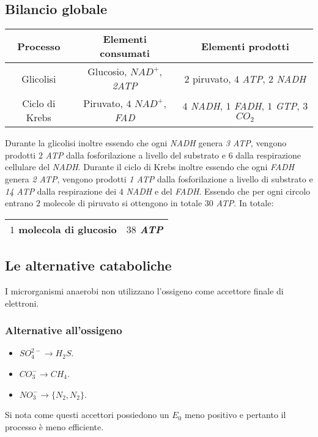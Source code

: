 	\subsection{Bilancio globale}
	\begin{center}
		\begin{tabular}{|c|c|c|}
			\hline
			Processo & Elementi consumati & Elementi prodotti \\
			\hline
			Glicolisi & Glucosio, \emph{$NAD^+$}, \emph{2ATP} & $2$ piruvato, $4$ \emph{ATP}, $2$ \emph{NADH} \\
			\hline
			Ciclo di Krebs & Piruvato, $4$ \emph{$NAD^+$}, \emph{FAD} & $4$ \emph{NADH}, $1$ \emph{FADH}, $1$ \emph{GTP}, $3$ \emph{$CO_2$} \\
			\hline
		\end{tabular}
	\end{center}
	Durante la glicolisi inoltre essendo che ogni \emph{NADH} genera \emph{3 ATP}, vengono prodotti $2$ \emph{ATP} dalla fosforilazione a livello del substrato e $6$ dalla respirazione cellulare del \emph{NADH}.
	Durante il ciclo di Krebs inoltre essendo che ogni \emph{FADH} genera \emph{2 ATP}, vengono prodotti \emph{1 ATP} dalla fosforilazione a livello di substrato e \emph{14 ATP} dalla respirazione
	dei $4$ \emph{NADH} e del \emph{FADH}.
	Essendo che per ogni circolo entrano $2$ molecole di piruvato si ottengono in totale $30$ \emph{ATP}.
	In totale:
	\begin{center}
		\begin{tabular}{|c|c|}
			\hline
			$1$ molecola di glucosio & $38$ \emph{ATP}\\
			\hline
		\end{tabular}
	\end{center}

	\subsection{Le alternative cataboliche}
	I microrganismi anaerobi non utilizzano l'ossigeno come accettore finale di elettroni.
		
		\subsubsection{Alternative all'ossigeno}
		\begin{multicols}{3}
			\begin{itemize}
				\item \emph{$SO_4^{2-}\rightarrow H_2S$}.
				\item \emph{$CO_3^- \rightarrow CH_4$}.
				\item \emph{$NO_3^-\rightarrow \{N_2, N_2\}$}.
			\end{itemize}
		\end{multicols}
		Si nota come questi accettori possiedono un $E_0$ meno positivo e pertanto il processo \`e meno efficiente.

